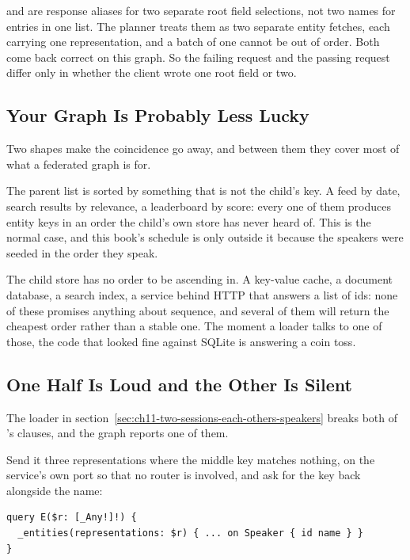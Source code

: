  and  are response aliases for two separate root
field selections, not two names for entries in one  list.
The planner treats them as two separate entity
fetches, each carrying one representation, and a batch of one cannot be out of
order. Both come back correct on this graph. So the failing request and the
passing request differ only in whether the client wrote one root field or two.

\subsection{Your Graph Is Probably Less Lucky}

%
Two shapes make the coincidence go away, and between them they cover most of
what a federated graph is for.

%
The parent list is sorted by something that is not the child's key. A feed by
date, search results by relevance, a leaderboard by score: every one of them
produces entity keys in an order the child's own store has never heard of. This
is the normal case, and this book's schedule is only outside it because the
speakers were seeded in the order they speak.

%
The child store has no order to be ascending in. A key-value cache, a document
database, a search index, a service behind HTTP that answers a list of ids: none
of these promises anything about sequence, and several of them will return the
cheapest order rather than a stable one. The moment a loader talks to one of
those, the code that looked fine against SQLite is answering a coin toss.

\subsection{One Half Is Loud and the Other Is Silent}

%
The loader in section~\ref{sec:ch11-two-sessions-each-others-speakers} breaks
both of 's clauses, and the graph reports one of them.

Send it three representations where the middle key matches nothing, on the
service's own port so that no router is involved, and ask for the key back
alongside the name:

\begin{verbatim}
query E($r: [_Any!]!) {
  _entities(representations: $r) { ... on Speaker { id name } }
}
\end{verbatim}

